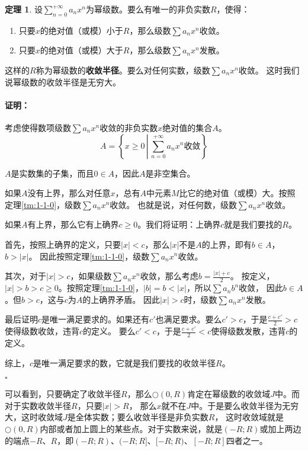 \documentclass[12pt,UTF8]{ctexbook}
\theoremstyle{definition}
\newtheorem{tm}{定理}[section]
\theoremstyle{plain}
\renewenvironment{proof}{\paragraph{\textbf{证明：}}}{\hfill$\square$}
\begin{document}
\begin{tm}\label{tm:1-1-10}
    设$\displaystyle\sum_{n=0}^{+\infty} a_n x^n$为幂级数。要么有唯一的非负实数$R$，使得：
    \begin{enumerate}
        \item 只要$x$的绝对值（或模）小于$R$，那么级数$\sum a_n x^n$收敛。
        \item 只要$x$的绝对值（或模）大于$R$，那么级数$\sum a_n x^n$发散。
    \end{enumerate}
    这样的$R$称为幂级数的\textbf{收敛半径}。要么对任何实数，级数$\sum a_n x^n$收敛。
    这时我们说幂级数的收敛半径是无穷大。
\end{tm}

\begin{proof}
    考虑使得数项级数$\sum a_n x^n$收敛的非负实数$x$绝对值的集合$A$。
    $$A = \left\{ x \geqslant 0 \, \left| \, \sum_{n=0}^{+\infty} a_n x^n \mbox{收敛} \right. \right\} $$

    $A$是实数集的子集，而且$0\in A$，因此$A$是非空集合。

    如果$A$没有上界，那么对任意$x$，总有$A$中元素$M$比它的绝对值（或模）大。按照定理\ref{tm:1-1-0}，级数$\sum a_n x^n$收敛。
    也就是说，对任何数，级数$\sum a_n x^n$收敛。

    如果$A$有上界，那么它有上确界$c\geqslant 0$。我们将证明：上确界$c$就是我们要找的$R$。
    
    首先，按照上确界的定义，只要$|x|<c$，那么$|x|$不是$A$的上界，即有$b\in A$，$b>|x|$。
    因此按照定理\ref{tm:1-1-0}，级数$\sum a_n x^n$收敛。

    其次，对于$|x|>c$，如果级数$\sum a_n x^n$收敛，那么考虑$b = \frac{|x| + c}{2}$。
    按定义，$|x| > b > c \geqslant 0$。按照定理\ref{tm:1-1-0}，$|b| = b < |x|$，所以$\sum a_n b^n$收敛，
    因此$b \in A$。但$b>c$，这与$c$为$A$的上确界矛盾。
    因此$|x|>c$时，级数$\sum a_n x^n$发散。

    最后证明$c$是唯一满足要求的。如果还有$c'$也满足要求。要么$c'>c$，于是$\frac{c+c'}{2} > c$使得级数收敛，违背$c$的定义。
    要么$c'<c$，于是$\frac{c+c'}{2} < c$使得级数发散，违背$c$的定义。

    综上，$c$是唯一满足要求的数，它就是我们要找的收敛半径$R$。

\end{proof}

可以看到，只要确定了收敛半径$R$，那么$\bigcirc(0,R)$肯定在幂级数的收敛域$J$中。而对于实数收敛半径$R$，只要$|x|>R$，
那么$x$就不在$J$中。于是要么收敛半径为无穷大，这时收敛域$J$是全体实数；要么收敛半径是非负实数$R$，
这时收敛域就是$\bigcirc(0,R)$内部或者加上圆上的某些点。对于实数来说，就是$(-R;R)$或加上两边的端点$-R$、$R$，即$(-R;R)$、$(-R;R]$、$[-R;R)$、$[-R;R]$四者之一。
\end{document}
